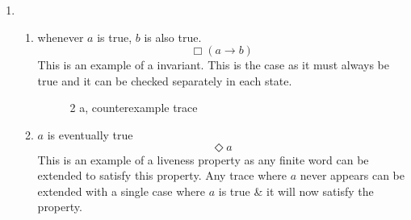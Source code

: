 \documentclass{article}
\begin{document}
\begin{enumerate}
    \item 
        \begin{enumerate}[label=(\alph*)]
            \item whenever $a$ is true, $b$ is also true.
                \begin{equation}
                    \Box(a \rightarrow b)
                \end{equation}
                This is an example of a invariant. This is the case as it must always be true and it can be checked separately in each state.
                \begin{figure}[htpb]
                    \centering
                    \caption{2 a, counterexample trace}%
                    \label{fig:2a}
                \end{figure}
            \item $a$ is eventually true
                \begin{equation}
                    \Diamond a
                \end{equation}
                This is an example of a liveness property as any finite word can be extended to satisfy this property. Any trace where $a$ never appears can be extended with a single case where $a$ is true \& it will now satisfy the property.
                \begin{figure}[htpb]
                    \centering
                    \begin{tikzpicture}

\end{tikzpicture}
\end{figure}
\end{enumerate}
\end{enumerate}
\end{document}
